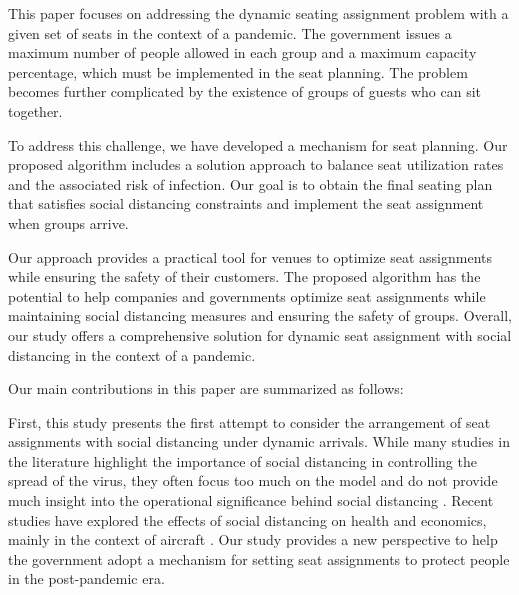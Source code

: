 
This paper focuses on addressing the dynamic seating assignment problem with a given set of seats in the context of a pandemic. The government issues a maximum number of people allowed in each group and a maximum capacity percentage, which must be implemented in the seat planning. The problem becomes further complicated by the existence of groups of guests who can sit together.

To address this challenge, we have developed a mechanism for seat planning. Our proposed algorithm includes a solution approach to balance seat utilization rates and the associated risk of infection. Our goal is to obtain the final seating plan that satisfies social distancing constraints and implement the seat assignment when groups arrive.

Our approach provides a practical tool for venues to optimize seat assignments while ensuring the safety of their customers. The proposed algorithm has the potential to help companies and governments optimize seat assignments while maintaining social distancing measures and ensuring the safety of groups. Overall, our study offers a comprehensive solution for dynamic seat assignment with social distancing in the context of a pandemic.


Our main contributions in this paper are summarized as follows:

First, this study presents the first attempt to consider the arrangement of seat assignments with social distancing under dynamic arrivals. While many studies in the literature highlight the importance of social distancing in controlling the spread of the virus, they often focus too much on the model and do not provide much insight into the operational significance behind social distancing \cite{barry2021optimal, fischetti2021safe}. Recent studies have explored the effects of social distancing on health and economics, mainly in the context of aircraft \cite{salari2020social, ghorbani2020model, salari2022social}. Our study provides a new perspective to help the government adopt a mechanism for setting seat assignments to protect people in the post-pandemic era.

